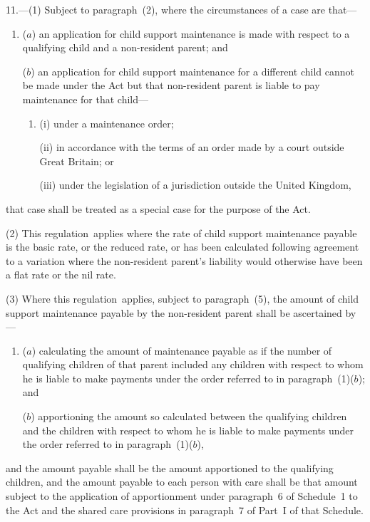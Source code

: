 \documentclass[12pt,a4paper]{article}
\begin{document}
11.---(1)  Subject to paragraph~(2), where the circumstances of a case are that—
\begin{enumerate}\item[]
($a$) an application for child support maintenance is made 
with respect to a qualifying child and a non-resident parent; and

($b$) an application for child support maintenance for a different child cannot be made under the Act but that non-resident parent is liable to pay maintenance 
for that child—
\begin{enumerate}\item[]
    (i) 
    under a maintenance order;

    (ii) 
    in accordance with the terms of an order made by a court outside Great Britain; or

    (iii)
    under the legislation of a jurisdiction outside the United Kingdom,
\end{enumerate}
\end{enumerate}
    that case shall be treated as a special case for the purpose of the Act.

(2) This regulation~applies where the rate of child support maintenance payable is the basic rate, or the reduced rate, or has been calculated following agreement to a variation where the non-resident parent’s liability would otherwise have been a flat rate or the nil rate.

(3) Where this regulation~applies, 
subject to paragraph~(5),  %
the amount of child support maintenance payable by the non-resident parent shall be ascertained by—
\begin{enumerate}\item[]
($a$) calculating the amount of maintenance payable as if the number of qualifying children of that parent included any children with respect to whom he is liable to make payments under the order referred to in paragraph~(1)($b$); and

($b$) apportioning the amount so calculated between the qualifying children and the children with respect to whom he is liable to make payments under the order referred to in paragraph~(1)($b$),
\end{enumerate}
and the amount payable shall be the amount apportioned to the qualifying children, and the amount payable to each person with care shall be that amount subject to the application of apportionment under paragraph~6 of Schedule~1 to the Act and the shared care provisions in paragraph~7 of Part~I of that Schedule.
\end{document}
